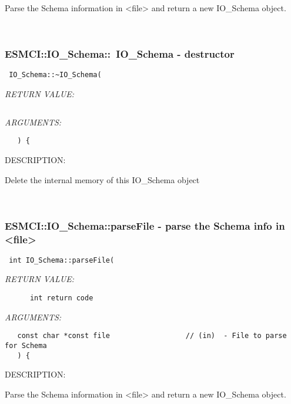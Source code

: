       Parse the Schema information in <file> and return a new IO_Schema
      object.
 
   
 
\mbox{}\hrulefill\
 
\subsubsection [ESMCI::IO\_Schema::~IO\_Schema] {ESMCI::IO\_Schema::~IO\_Schema - destructor}


  
\begin{verbatim} IO_Schema::~IO_Schema(\end{verbatim}{\em RETURN VALUE:}
\begin{verbatim}      \end{verbatim}{\em ARGUMENTS:}
\begin{verbatim}   ) {\end{verbatim}
{\sf DESCRIPTION:\\ }


      Delete the internal memory of this IO_Schema object
 
   
 
\mbox{}\hrulefill\
 
\subsubsection [ESMCI::IO\_Schema::parseFile] {ESMCI::IO\_Schema::parseFile - parse the Schema info in <file>}


  
\begin{verbatim} int IO_Schema::parseFile(\end{verbatim}{\em RETURN VALUE:}
\begin{verbatim}      int return code\end{verbatim}{\em ARGUMENTS:}
\begin{verbatim}   const char *const file                  // (in)  - File to parse for Schema
   ) {\end{verbatim}
{\sf DESCRIPTION:\\ }


      Parse the Schema information in <file> and return a new IO_Schema
      object.
 
   
 
